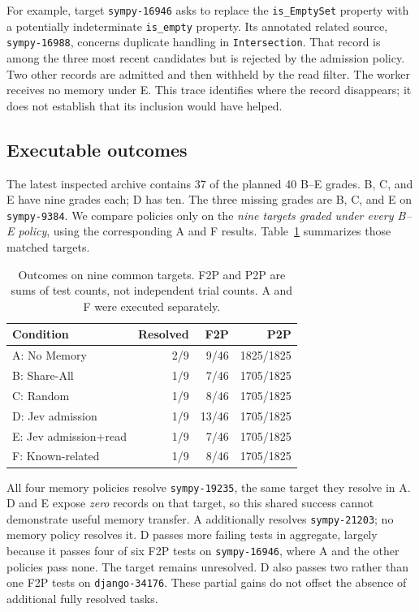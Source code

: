 \documentclass[sigconf,anonymous]{aamas}
\begin{document}
For example, target \texttt{sympy-16946} asks to replace the \texttt{is\_EmptySet} property with a potentially indeterminate \texttt{is\_empty} property. Its annotated related source, \texttt{sympy-16988}, concerns duplicate handling in \texttt{Intersection}. That record is among the three most recent candidates but is rejected by the admission policy. Two other records are admitted and then withheld by the read filter. The worker receives no memory under E. This trace identifies where the record disappears; it does not establish that its inclusion would have helped.

\subsection{Executable outcomes}
The latest inspected archive contains 37 of the planned 40 B--E grades. B, C, and E have nine grades each; D has ten. The three missing grades are B, C, and E on \texttt{sympy-9384}. We compare policies only on the \emph{nine targets graded under every B--E policy}, using the corresponding A and F results. Table~\ref{tab:aggregate} summarizes those matched targets.

\begin{table}[t]
\caption{Outcomes on nine common targets. F2P and P2P are sums of test counts, not independent trial counts. A and F were executed separately.}
\label{tab:aggregate}
\centering
\begin{tabular}{lrrr}
\toprule
Condition & Resolved & F2P & P2P \\
\midrule
A: No Memory & 2/9 & 9/46 & 1825/1825\\
B: Share-All & 1/9 & 7/46 & 1705/1825\\
C: Random & 1/9 & 8/46 & 1705/1825\\
D: Jev admission & 1/9 & 13/46 & 1705/1825\\
E: Jev admission+read & 1/9 & 7/46 & 1705/1825\\
F: Known-related & 1/9 & 8/46 & 1705/1825\\
\bottomrule
\end{tabular}
\end{table}

All four memory policies resolve \texttt{sympy-19235}, the same target they resolve in A. D and E expose \emph{zero} records on that target, so this shared success cannot demonstrate useful memory transfer. A additionally resolves \texttt{sympy-21203}; no memory policy resolves it. D passes more failing tests in aggregate, largely because it passes four of six F2P tests on \texttt{sympy-16946}, where A and the other policies pass none. The target remains unresolved. D also passes two rather than one F2P tests on \texttt{django-34176}. These partial gains do not offset the absence of additional fully resolved tasks.
\end{document}
